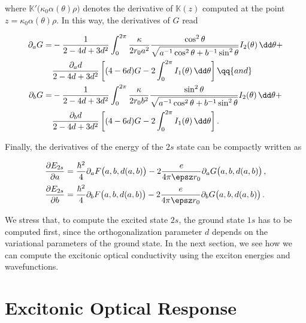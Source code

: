 \noindent where $\mathds{K}' \big(\kappa_0 \alpha (\theta) \rho\big)$ denotes the derivative of $\mathds{K} (z)$ computed at the point $z=\kappa_0 \alpha (\theta) \rho$.
In this way, the derivatives of $G$ read

\begin{equation}
    \begin{aligned}
        \partial_{a} G =& - \frac{1}{2 - 4d + 3d^2} \int_0^{2 \pi} \frac{\kappa}{2 r_0 a^2} \frac{\cos^2 \theta}{\sqrt{a^{-1} \cos^2 \theta + b^{-1} \sin^2 \theta}} I_2(\theta)\,  \dd \theta + \\
                        & \frac{\partial_{a} d}{2 - 4d + 3d^2} \left[ (4 - 6d)G -2 \int_0^{2 \pi}I_1(\theta) \, \dd \theta \right] \qq{and} \\
        \partial_{b} G =& - \frac{1}{2 - 4d + 3d^2} \int_0^{2 \pi} \frac{\kappa}{2 r_0 b^2} \frac{\sin^2 \theta}{\sqrt{a^{-1} \cos^2 \theta + b^{-1} \sin^2 \theta}} I_2(\theta)\,  \dd \theta + \\
                        & \frac{\partial_{b} d}{2 - 4d + 3d^2} \left[ (4 - 6d)G -2 \int_0^{2 \pi}I_1(\theta) \, \dd \theta \right] .
    \end{aligned}
\end{equation}

Finally, the derivatives of the energy of the $2s$ state can be compactly written as

\begin{subequations}
    \begin{align}
        &\frac{\partial E_{2s}}{\partial a} = \frac{\hbar^2}{4} \partial_{a} F \big(a,b, d(a,b)\big) - 2 \frac{e}{4 \pi \epsz r_0} \partial_{a} G \big(a,b, d(a,b)\big)\,, \\
        &\frac{\partial E_{2s}}{\partial b} = \frac{\hbar^2}{4} \partial_{b} F \big(a,b, d(a,b)\big) - 2 \frac{e}{4 \pi \epsz r_0} \partial_{b} G \big(a,b, d(a,b)\big) \,.
    \end{align}
\end{subequations}

We stress that, to compute the excited state $2s$, the ground state $1s$ has to be computed first, since the orthogonalization parameter $d$ depends on the variational parameters of the ground state.
In the next section, we see how we can compute the excitonic optical conductivity using the exciton energies and wavefunctions.

\section{Excitonic Optical Response}
\label{sec:exciton_optical_response}

